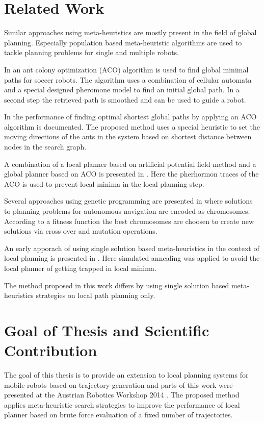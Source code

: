 \section{Related Work}\label{sec:relwork}
Similar approaches using meta-heuristics are mostly present in the field of global planning. Especially population based meta-heuristic algorithms are used to tackle planning problems for single and multiple robots.

In \cite{zhou2010improvedantcolony} an ant colony optimization (ACO) algorithm is used to find global minimal paths for soccer robots. 
The algorithm uses a combination of cellular automata and a special designed pheromone model to find an initial global path. 
In a second step the retrieved path is smoothed and can be used to guide a robot.

In \cite{buniyamin2011robotantcolony} the performance of finding optimal shortest global paths by applying an ACO algorithm is documented. 
The proposed method uses a special heuristic to set the moving directions of the ants in the system based on shortest distance between nodes in the search graph.  

A combination of a local planner based on artificial potential field method and a global planner based on ACO is presented in \cite{mei2006hybrid}. 
Here the pherhormon traces of the ACO is used to prevent local minima in the local planning step.

Several approaches using genetic programming are presented in \cite{manikas2007genetic} where solutions to planning problems for autonomous navigation are encoded as chromosomes. 
According to a fitness function the best chromosomes are choosen to create new solutions via cross over and mutation operations. 

An early apporach of using single solution based meta-heuristics in the context of local planning is presented in \cite{park2001obstacle}.
Here simulated annealing was applied to avoid the local planner of getting trapped in local minima.




The method proposed in this work differs by using single solution based meta-heuristics strategies on local path planning only.

\section{Goal of Thesis and Scientific Contribution}\label{sec:goal}
The goal of this thesis is to provide an extension to local planning systems for mobile robots based on trajectory generation and parts of this work were presented at the Austrian Robotics Workshop 2014 \cite{myself}. 
The proposed method applies meta-heuristic search strategies to improve the performance of local planner based on brute force evaluation of a fixed number of trajectories.

